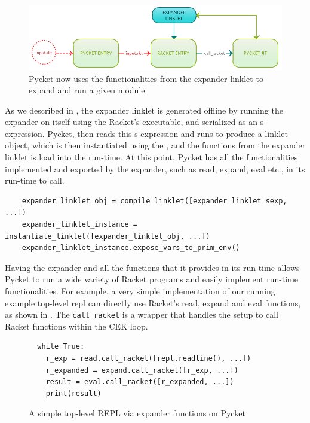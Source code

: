 \vspace{-0.1cm}

\begin{figure}[h!]
  \centering
\includegraphics[scale=0.3]{img/new-pycket-yatay}
\caption{Pycket now uses the functionalities from the expander linklet to expand and run a given module.}
\label{fig:new-pycket}
\end{figure}

\vspace{-0.25cm}

As we described in , the expander linklet
is generated offline by running the expander on itself using the
Racket's executable, and serialized as an s-expression. Pycket, then
reads this s-expression and runs  to produce a
linklet object, which is then instantiated using the
, and the functions from the expander
linklet is load into the run-time. At this point, Pycket has all the
functionalities implemented and exported by the expander, such as
read, expand, eval etc., in its run-time to call.

\begin{verbatim}
    expander_linklet_obj = compile_linklet([expander_linklet_sexp, ...])
    expander_linklet_instance = instantiate_linklet([expander_linklet_obj, ...])
    expander_linklet_instance.expose_vars_to_prim_env()
\end{verbatim}

Having the expander and all the functions that it provides in its
run-time allows Pycket to run a wide variety of Racket programs and
easily implement run-time functionalities. For example, a very simple
implementation of our running example top-level repl can directly use
Racket's read, expand and eval functions, as shown in
. The \verb|call_racket| is a wrapper that
handles the setup to call Racket functions within the CEK loop.

\begin{figure}
  \vspace{-0.25cm}
\begin{verbatim}
  while True:
    r_exp = read.call_racket([repl.readline(), ...])
    r_expanded = expand.call_racket([r_exp, ...])
    result = eval.call_racket([r_expanded, ...])
    print(result)
\end{verbatim}
\caption{A simple top-level REPL via expander functions on Pycket}
\label{fig:repl-rpython}
\end{figure}

